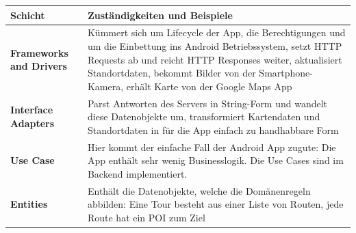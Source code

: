 \documentclass[a4paper,10pt,xetex]{article}
\begin{document}
\begin{longtabu} to \textwidth { | l | X[l] |  }
\hline
\textbf{Schicht} &  \textbf{Zuständigkeiten und Beispiele} \\\hline
\endhead
\textbf{Frameworks and Drivers} & Kümmert sich um Lifecycle der App, die Berechtigungen
und um die Einbettung ins Android Betriebssystem, setzt HTTP Requests ab und reicht
HTTP Responses weiter, aktualisiert Standortdaten, bekommt Bilder von der
Smartphone-Kamera, erhält Karte von der Google Maps App\\\hline
\textbf{Interface Adapters} & Parst Antworten des Servers in String-Form und wandelt
diese Datenobjekte um, transformiert Kartendaten und Standortdaten in für die App
einfach zu handhabbare Form\\\hline
\textbf{Use Case} & Hier kommt der einfache Fall der Android App zugute: Die App
enthält sehr wenig Businesslogik. Die Use Cases sind im Backend implementiert.\\\hline
\textbf{Entities} & Enthält die Datenobjekte, welche die Domänenregeln abbilden:
Eine Tour besteht aus einer Liste von Routen, jede Route hat ein POI zum Ziel\\\hline
\end{longtabu}
\end{document}
